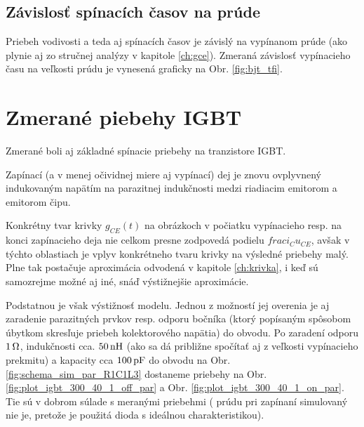 \subsection{Závislosť spínacích časov na prúde}

Priebeh vodivosti a teda aj spínacích časov je závislý na vypínanom prúde (ako plynie aj zo stručnej analýzy v kapitole \ref{ch:gce}). Zmeraná závislosť vypínacieho času na veľkosti prúdu je vynesená graficky na Obr. \ref{fig:bjt_tfi}.



\newpage
\section{Zmerané piebehy IGBT} \label{sec:vysl_IGBT}

Zmerané boli aj základné spínacie priebehy na tranzistore IGBT. 

Zapínací (a v menej očividnej miere aj vypínací) dej je znovu ovplyvnený indukovaným napätím na parazitnej indukčnosti medzi riadiacim emitorom a emitorom čipu. 




Konkrétny tvar krivky $g_{CE}(t)$ na obrázkoch v počiatku vypínacieho resp. na konci zapínacieho deja nie celkom presne zodpovedá podielu $frac{i_C}{u_{CE}}$, avšak v týchto oblastiach je vplyv  konkrétneho tvaru krivky na výsledné priebehy malý. Plne tak postačuje aproximácia odvodená v kapitole \ref{ch:krivka}, i keď sú samozrejme možné aj iné, snáď výstižnejšie aproximácie.

Podstatnou je však výstižnosť modelu. Jednou z možností jej overenia je aj zaradenie parazitných prvkov resp. odporu bočníka (ktorý popísaným spôsobom úbytkom skresľuje priebeh kolektorového napätia) do obvodu. Po zaradení odporu $1\, \mathrm{\Omega}$, indukčnosti cca. $50\, \mathrm{nH}$ (ako sa dá približne spočítať aj z veľkosti vypínacieho prekmitu) a kapacity cca $100\, \mathrm{pF}$ do obvodu na Obr. \ref{fig:schema_sim_par_R1C1L3} dostaneme priebehy na Obr. \ref{fig:plot_igbt_300_40_1_off_par} a Obr. \ref{fig:plot_igbt_300_40_1_on_par}. Tie sú v dobrom súlade s meranými priebehmi ( prúdu pri zapínaní simulovaný nie je, pretože je použitá dioda s ideálnou charakteristikou).



